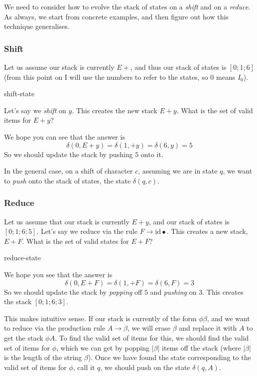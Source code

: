 We need to consider how to evolve the stack of states on a \textit{shift} and on a \textit{reduce}. As always, we start from concrete examples, and then figure out how this technique generalises.

\subsubsection{Shift}
Let us assume our stack is currently $E+$, and thus our stack of states is $[0;1;6]$ (from this point on I will use the numbers to refer to the states, so $0$ means $I_0$). 
\begin{center}
    {shift-state}
\end{center}
Let's say we \textit{shift} on $y$. This creates the new stack $E+y$. What is the set of valid items for $E+y$?

We hope you can see that the answer is 
\[\delta(0, E+y) = \delta(1, +y) = \delta(6, y) = 5\]
So we should update the stack by pushing $5$ onto it.

In the general case, on a shift of character $c$, assuming we are in state $q$, we want to \textit{push} onto the stack of states, the state $\delta(q, c)$.

\subsubsection{Reduce}
Let us assume that our stack is currently $E+y$, and our stack of states is $[0;1;6;5]$. Let's say we reduce via the rule $F \to \text{id} \bullet$. This creates a new stack, $E+F$. What is the set of valid states for $E+F$?
\begin{center}
    {reduce-state}
\end{center}
We hope you see that the answer is \[\delta(0, E+F) = \delta(1, +F) = \delta(6, F) = 3\] So we should update the stack by \textit{popping} off $5$ and \textit{pushing} on $3$. This creates the stack $[0;1;6;3]$.

This makes intuitive sense. If our stack is currently of the form $\phi\beta$, and we want to reduce via the production rule $A \to \beta$, we will erase $\beta$ and replace it with $A$ to get the stack $\phi A$. To find the valid set of items for this, we should find the valid set of items for $\phi$, which we can get by popping $|\beta|$ items off the stack (where $|\beta|$ is the length of the string $\beta$). Once we have found the state corresponding to the valid set of items for $\phi$, call it $q$, we should push on the state $\delta(q, A)$.

